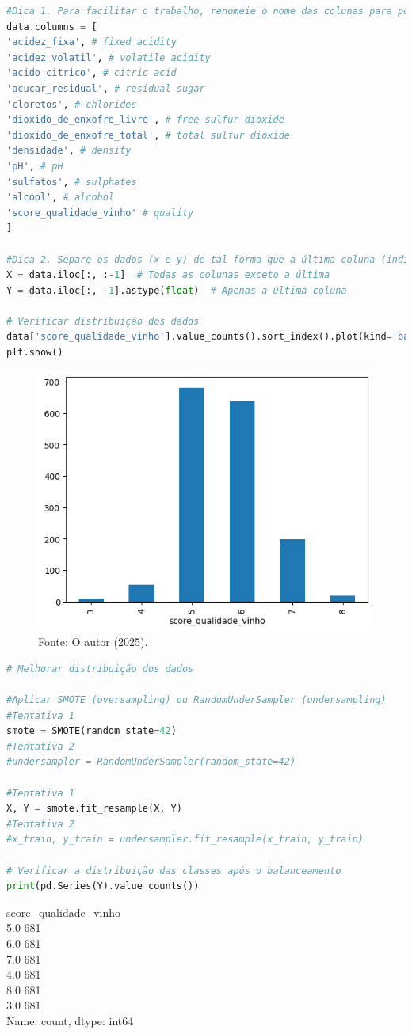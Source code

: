 \begin{lstlisting}[language=Python, style=input]
#Dica 1. Para facilitar o trabalho, renomeie o nome das colunas para português, dessa forma:
data.columns = [
'acidez_fixa', # fixed acidity
'acidez_volatil', # volatile acidity
'acido_citrico', # citric acid
'acucar_residual', # residual sugar
'cloretos', # chlorides
'dioxido_de_enxofre_livre', # free sulfur dioxide
'dioxido_de_enxofre_total', # total sulfur dioxide
'densidade', # density
'pH', # pH
'sulfatos', # sulphates
'alcool', # alcohol
'score_qualidade_vinho' # quality
]

#Dica 2. Separe os dados (x e y) de tal forma que a última coluna (índice -1), chamada score_qualidade_vinho, seja a variável target (y)
X = data.iloc[:, :-1]  # Todas as colunas exceto a última
Y = data.iloc[:, -1].astype(float)  # Apenas a última coluna

# Verificar distribuição dos dados
data['score_qualidade_vinho'].value_counts().sort_index().plot(kind='bar')
plt.show()
\end{lstlisting}
\begin{figure}[H]
\centering
\caption{Distribuição dos dados - Wine quality}
\includegraphics[width=.8\linewidth]{apendices/fig/13_IAA012_5.png}
\caption*{Fonte: O autor (2025).}
\end{figure}
\begin{lstlisting}[language=Python, style=input]
# Melhorar distribuição dos dados

#Aplicar SMOTE (oversampling) ou RandomUnderSampler (undersampling)
#Tentativa 1
smote = SMOTE(random_state=42)
#Tentativa 2
#undersampler = RandomUnderSampler(random_state=42)

#Tentativa 1
X, Y = smote.fit_resample(X, Y)
#Tentativa 2
#x_train, y_train = undersampler.fit_resample(x_train, y_train)

# Verificar a distribuição das classes após o balanceamento
print(pd.Series(Y).value_counts())
\end{lstlisting}
\begin{tcolorbox}[myoutputstyle]
score\_qualidade\_vinho\\
5.0    681\\
6.0    681\\
7.0    681\\
4.0    681\\
8.0    681\\
3.0    681\\
Name: count, dtype: int64
\end{tcolorbox}
